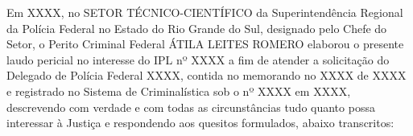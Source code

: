 	Em 
XXXX,
	no SETOR TÉCNICO-CIENTÍFICO da Superintendência
	Regional da Polícia Federal no Estado do Rio Grande do Sul, designado pelo Chefe do Setor,	o Perito Criminal Federal ÁTILA LEITES ROMERO elaborou o presente laudo pericial no	interesse do 
IPL nº XXXX
	a fim de atender a solicitação do 
Delegado de Polícia Federal
XXXX,
	contida no 
memorando no XXXX
de XXXX
	e registrado no Sistema de Criminalística sob o nº 
XXXX 
em XXXX, 
	descrevendo com verdade e com todas as circunstâncias tudo quanto possa interessar à Justiça e respondendo aos	quesitos formulados, abaixo transcritos:


